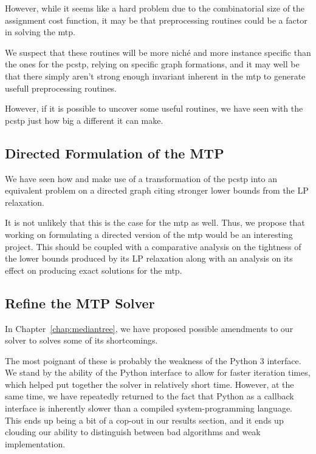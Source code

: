 However, while it seems like a hard problem due to the combinatorial size of the assignment
cost function, it may be that preprocessing routines could be a factor in solving the
\gls{mtp}.

We suspect that these routines will be more niché and more instance specific
than the ones for the \gls{pcstp}, relying
on specific graph formations, and it may well be that there simply aren't strong enough
invariant inherent in the \gls{mtp} to generate usefull preprocessing routines.

However, if it is possible to uncover some useful routines, we have seen with the \gls{pcstp}
just how big a different it can make.

\subsection{Directed Formulation of the MTP}

We have seen how \citet{ljubic2005solving} and \citet{gamrath2017scip}
make use of a transformation of
the \gls{pcstp} into an equivalent problem on a directed graph citing stronger
lower bounds from the LP relaxation.
  
It is not unlikely that this is the case for the \gls{mtp} as well. Thus, we propose
that working on formulating a directed version of the \gls{mtp} would be an
interesting project.
This should be coupled with a comparative analysis
on the tightness of the lower bounds produced by its LP relaxation along with an
analysis on its effect on producing exact solutions for the \gls{mtp}.

\subsection{Refine the MTP Solver}

In Chapter~\ref{chap:mediantree}, we have proposed possible amendments to our solver to
solves some of its shortcomings.

The most poignant of these is probably the weakness of the Python 3 interface.
We stand by the ability of the Python interface to allow for faster iteration times,
which helped put together the solver in relatively short time.
However, at the same time, we have repeatedly
returned to the fact that Python as a callback interface is
inherently slower than a compiled system-programming language.
This ends up being a bit of a cop-out in our results section,
and it ends up clouding our ability
to distinguish between bad algorithms
and weak implementation.

